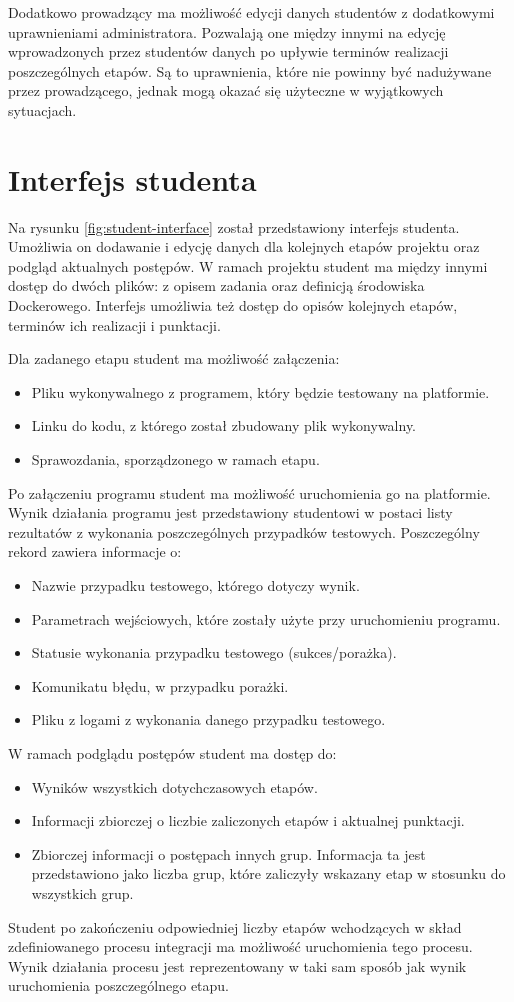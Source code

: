 Dodatkowo prowadzący ma możliwość edycji danych studentów z dodatkowymi uprawnieniami administratora.
Pozwalają one między innymi na edycję wprowadzonych przez studentów danych po upływie terminów realizacji poszczególnych etapów.
Są to uprawnienia, które nie powinny być nadużywane przez prowadzącego, jednak mogą okazać się użyteczne w wyjątkowych sytuacjach.


\section{Interfejs studenta}

Na rysunku \ref{fig:student-interface} został przedstawiony interfejs studenta.
Umożliwia on dodawanie i edycję danych dla kolejnych etapów projektu oraz podgląd aktualnych postępów.
W ramach projektu student ma między innymi dostęp do dwóch plików: z opisem zadania oraz definicją środowiska Dockerowego.
Interfejs umożliwia też dostęp do opisów kolejnych etapów, terminów ich realizacji i punktacji.

Dla zadanego etapu student ma możliwość załączenia:
\begin {itemize}
    \item Pliku wykonywalnego z programem, który będzie testowany na platformie.
    \item Linku do kodu, z którego został zbudowany plik wykonywalny.
    \item Sprawozdania, sporządzonego w ramach etapu.
\end {itemize}

Po załączeniu programu student ma możliwość uruchomienia go na platformie.
Wynik działania programu jest przedstawiony studentowi w postaci listy rezultatów z wykonania poszczególnych przypadków testowych.
Poszczególny rekord zawiera informacje o:
\begin {itemize}
    \item Nazwie przypadku testowego, którego dotyczy wynik.
    \item Parametrach wejściowych, które zostały użyte przy uruchomieniu programu.
    \item Statusie wykonania przypadku testowego (sukces/porażka).
    \item Komunikatu błędu, w przypadku porażki.
    \item Pliku z logami z wykonania danego przypadku testowego.
\end{itemize}

W ramach podglądu postępów student ma dostęp do:
\begin {itemize}
    \item Wyników wszystkich dotychczasowych etapów.
    \item Informacji zbiorczej o liczbie zaliczonych etapów i aktualnej punktacji.
    \item Zbiorczej informacji o postępach innych grup.
    Informacja ta jest przedstawiono jako liczba grup, które zaliczyły wskazany etap w stosunku do wszystkich grup.
\end {itemize}

Student po zakończeniu odpowiedniej liczby etapów wchodzących w skład zdefiniowanego procesu integracji ma możliwość uruchomienia tego procesu.
Wynik działania procesu jest reprezentowany w taki sam sposób jak wynik uruchomienia poszczególnego etapu.